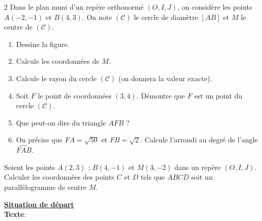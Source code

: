 \begin{multicols*}{2}
  	Dans le plan muni d'un repère orthonormé $(O,I,J)$, on considère les points $A(-2,-1)$ et $B(4,3)$. On note $(\mathscr{C})$ le cercle de diamètre $[AB]$ et $M$ le centre de $(\mathscr{C})$.
  	\begin{enumerate}
  		\item Dessine la figure.
  		\item Calcule les coordonnées de $M$.
  		\item Calcule le rayon du cercle $(\mathscr{C})$ (on donnera la valeur exacte).
  		\item Soit $F$ le point de coordonnées $(3,4)$.
  		Démontre que $F$ est un point du cercle $(\mathscr{C})$.
  		\item Que peut-on dire du triangle $AFB$ ?
  		\item On précise que $FA = \sqrt{50}$ et $FB = \sqrt{2}$.
  		Calcule l'arrondi au degré de l'angle $\widehat{FAB}$.
  	\end{enumerate}
  	
   Soient les points $A(2,3)$ ; $B(4,-1)$ et $M(3,-2)$ dans un repère $(O,I,J)$.
  	Calculer les coordonnées des points $C$ et $D$ tels que $ABCD$ soit un parallélogramme de centre $M$.
  	
   \setcounter{sequen}{0}
   \setcounter{q}{0}
 	\underline{\textbf{Situation de départ}} \\
 	\textbf{Texte}:	
 	

\end{multicols*}
